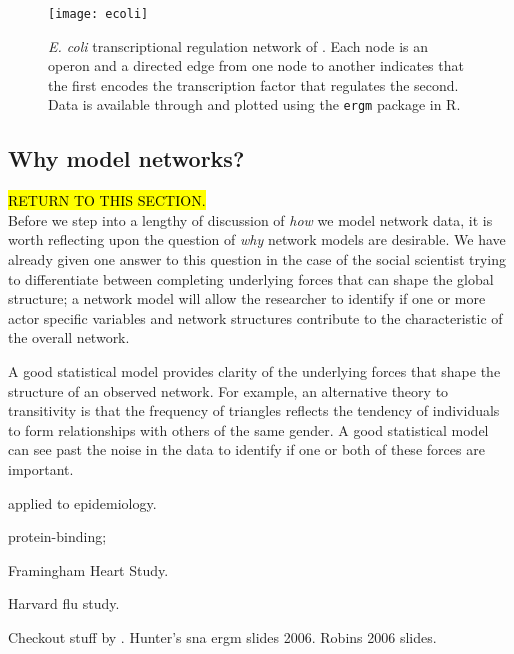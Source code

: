 \begin{figure}[h]
\begin{center}
\texttt{[image: ecoli]}
\end{center}
\caption[\textit{E. coli} transcriptional regulation network of \citet{Salgado,Shen-Orr}]{\textit{E. coli} transcriptional regulation network of \citet{Salgado,Shen-Orr}.  Each node is an operon and a directed edge from one node to another indicates 
that the first encodes the transcription factor that regulates the second.
Data is available through and plotted using the \texttt{ergm} package \citep{ergm} in 
R.}
\label{F:ecoli}
\end{figure}



\subsection{Why model networks?}
\hl{RETURN TO THIS SECTION.}\\
Before we step into a lengthy of discussion of \emph{how} we model network data, it is 
worth reflecting upon the question of \emph{why} network models are desirable.  We 
have already given one answer to this question in the case of the social scientist 
trying 
to differentiate between completing underlying forces that can shape the global 
structure; a network model will allow the researcher to identify if one or more actor 
specific variables and network structures contribute to the characteristic of the 
overall network.

A good statistical model provides clarity of the underlying forces that shape the 
structure of an observed network.   
For example, an alternative theory to transitivity is that the frequency of triangles 
reflects the tendency of individuals to form relationships with others of the same 
gender.  A good statistical model can see past the noise in the data to identify if 
one or both of these forces are important.   

\citet*{Welch:2011} applied to epidemiology.


protein-binding;

Framingham Heart Study.

Harvard flu study.

Checkout stuff by \citet*{Kolaczyk:slides,Goldenberg:2009,Goodreau:2009}.  Hunter's sna ergm slides 2006.
Robins 2006 slides.

